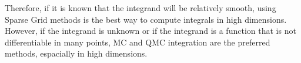 \documentclass[10pt,a4paper]{article}
\begin{document}
Therefore, if it is known that the integrand will be relatively smooth, using Sparse Grid methods is the best way to compute integrals in high dimensions. However, if the integrand is unknown or if the integrand is a function that is not differentiable in many points, MC and QMC integration are the preferred methods, espacially in high dimensions.
\end{document}
